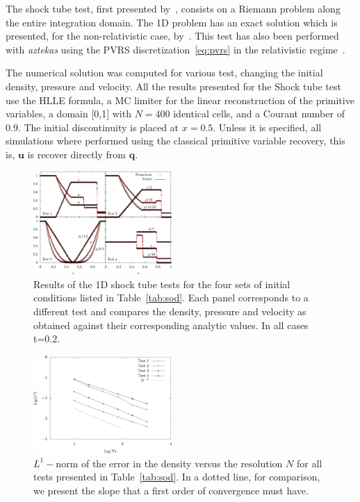 The shock tube test, first presented by~\citet{sod1978}, consists on a Riemann problem along the entire integration domain. The 1D problem has an exact solution which is presented, for the non-relativistic case, by~\citet{toro2009}. This test has also been performed with \textit{aztekas} using the PVRS discretization~\eqref{eq:pvrs} in the relativistic regime~\citep[see][]{aguayo2018}.

The numerical solution was computed for various test, changing the initial density, pressure and velocity. All the results presented for the Shock tube test use the HLLE formula, a MC limiter for the linear reconstruction of the primitive variables, a domain [0,1] with $N = 400$ identical cells, and a Courant number of 0.9. The initial discontinuity is placed at $x = 0.5$. Unless it is specified, all simulations where performed using the classical primitive variable recovery, this is, $\mathbf{u}$ is recover directly from $\mathbf{q}$.

\begin{figure}
    \centering
    \includegraphics[width=0.47\textwidth]{Figures/sodtests.eps}
    \caption{Results of the 1D shock tube tests for the four sets of initial conditions listed in Table~\ref{tab:sod}. Each panel corresponds to a different test and compares the density, pressure and velocity as obtained against their corresponding analytic values. In all cases t=0.2.}
    \label{fig:sodtests}
\end{figure}

\begin{figure}
    \centering
    \includegraphics[width=0.47\textwidth]{Figures/lnorm.eps}
    \caption{$L^1-$norm of the error in the density versus the resolution $N$ for all tests presented in Table~\ref{tab:sod}. In a dotted line, for comparison, we present the slope that a first order of convergence must have.}
    \label{fig:lnorm}
\end{figure}


